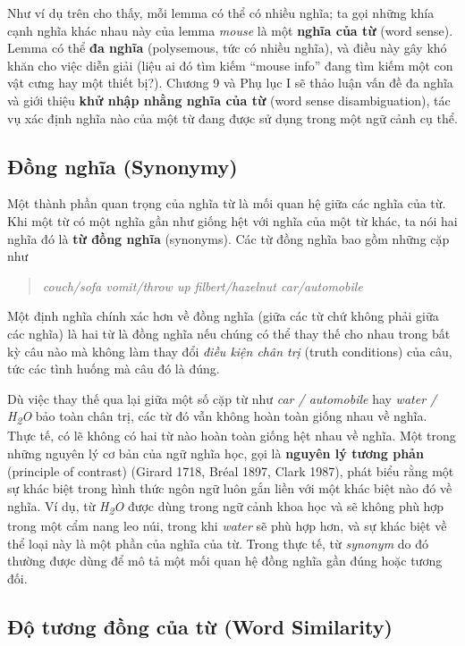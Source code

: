 Như ví dụ trên cho thấy, mỗi lemma có thể có nhiều nghĩa; ta gọi những khía cạnh nghĩa khác nhau này của lemma \emph{mouse} là một \textbf{nghĩa của từ} (word sense). Lemma có thể \textbf{đa nghĩa} (polysemous, tức có nhiều nghĩa), và điều này gây khó khăn cho việc diễn giải (liệu ai đó tìm kiếm ``mouse info'' đang tìm kiếm một con vật cưng hay một thiết bị?). Chương 9 và Phụ lục I sẽ thảo luận vấn đề đa nghĩa và giới thiệu \textbf{khử nhập nhằng nghĩa của từ} (word sense disambiguation), tác vụ xác định nghĩa nào của một từ đang được sử dụng trong một ngữ cảnh cụ thể.

\subsection*{Đồng nghĩa (Synonymy)}

Một thành phần quan trọng của nghĩa từ là mối quan hệ giữa các nghĩa của từ. Khi một từ có một nghĩa gần như giống hệt với nghĩa của một từ khác, ta nói hai nghĩa đó là \textbf{từ đồng nghĩa} (synonyms). Các từ đồng nghĩa bao gồm những cặp như

\begin{quote}
\emph{couch/sofa \quad vomit/throw up \quad filbert/hazelnut \quad car/automobile}
\end{quote}

Một định nghĩa chính xác hơn về đồng nghĩa (giữa các từ chứ không phải giữa các nghĩa) là hai từ là đồng nghĩa nếu chúng có thể thay thế cho nhau trong bất kỳ câu nào mà không làm thay đổi \emph{điều kiện chân trị} (truth conditions) của câu, tức các tình huống mà câu đó là đúng.

Dù việc thay thế qua lại giữa một số cặp từ như \emph{car / automobile} hay \emph{water / H\textsubscript{2}O} bảo toàn chân trị, các từ đó vẫn không hoàn toàn giống nhau về nghĩa. Thực tế, có lẽ không có hai từ nào hoàn toàn giống hệt nhau về nghĩa. Một trong những nguyên lý cơ bản của ngữ nghĩa học, gọi là \textbf{nguyên lý tương phản} (principle of contrast) (Girard 1718, Bréal 1897, Clark 1987), phát biểu rằng một sự khác biệt trong hình thức ngôn ngữ luôn gắn liền với một khác biệt nào đó về nghĩa. Ví dụ, từ \emph{H\textsubscript{2}O} được dùng trong ngữ cảnh khoa học và sẽ không phù hợp trong một cẩm nang leo núi, trong khi \emph{water} sẽ phù hợp hơn, và sự khác biệt về thể loại này là một phần của nghĩa của từ. Trong thực tế, từ \emph{synonym} do đó thường được dùng để mô tả một mối quan hệ đồng nghĩa gần đúng hoặc tương đối.

\subsection*{Độ tương đồng của từ (Word Similarity)}

